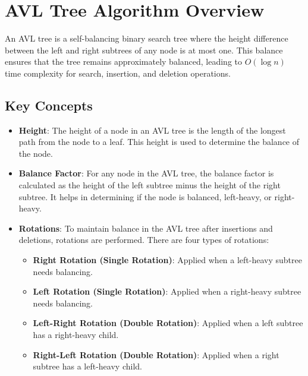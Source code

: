 \documentclass[10pt,a4paper]{article}
\begin{document}
\section*{AVL Tree Algorithm Overview}

An AVL tree is a self-balancing binary search tree where the height difference between the left and right subtrees of any node is at most one. This balance ensures that the tree remains approximately balanced, leading to $O(\log n)$ time complexity for search, insertion, and deletion operations.

\subsection*{Key Concepts}
\begin{itemize}
    \item \textbf{Height}: The height of a node in an AVL tree is the length of the longest path from the node to a leaf. This height is used to determine the balance of the node.
    \item \textbf{Balance Factor}: For any node in the AVL tree, the balance factor is calculated as the height of the left subtree minus the height of the right subtree. It helps in determining if the node is balanced, left-heavy, or right-heavy.
    \item \textbf{Rotations}: To maintain balance in the AVL tree after insertions and deletions, rotations are performed. There are four types of rotations:
    \begin{itemize}
        \item \textbf{Right Rotation (Single Rotation)}: Applied when a left-heavy subtree needs balancing.
        \item \textbf{Left Rotation (Single Rotation)}: Applied when a right-heavy subtree needs balancing.
        \item \textbf{Left-Right Rotation (Double Rotation)}: Applied when a left subtree has a right-heavy child.
        \item \textbf{Right-Left Rotation (Double Rotation)}: Applied when a right subtree has a left-heavy child.
    \end{itemize}
\end{itemize}
\end{document}
